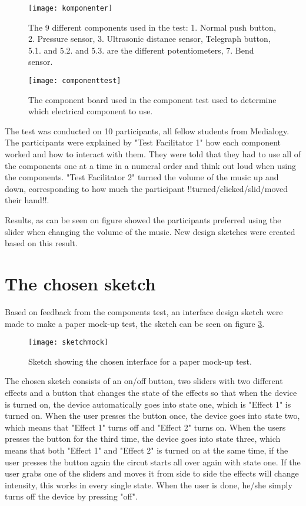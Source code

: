 \begin{figure}[!h] 
\centering
\texttt{[image: komponenter]}
\caption{\label{fig:komponenter} The 9 different components used in the test: 1. Normal push button, 2. Pressure sensor, 3. Ultrasonic distance sensor, Telegraph button, 5.1. and 5.2. and 5.3. are the different potentiometers, 7. Bend sensor.}
\end{figure}

\begin{figure}[!h] 
\centering
\texttt{[image: componenttest]}
\caption{\label{fig:componenttest} The component board used in the component test used to determine which electrical component to use.}
\end{figure}

The test was conducted on 10 participants, all fellow students from Medialogy. The participants were explained by "Test Facilitator 1" how each component worked and how to interact with them. They were told that they had to use all of the components one at a time in a numeral order and think out loud when using the components. "Test Facilitator 2" turned the volume of the music up and down, corresponding to how much the participant !!turned/clicked/slid/moved their hand!!.

Results, as can be seen on figure  showed the participants preferred using the slider when changing the volume of the music. New design sketches were created based on this result.


\section{The chosen sketch}
Based on feedback from the components test, an interface design sketch were made to make a paper mock-up test, the sketch can be seen on figure \ref{fig:sketchmock}. 

\begin{figure}[!h] 
\centering
\texttt{[image: sketchmock]}
\caption{\label{fig:sketchmock} Sketch showing the chosen interface for a paper mock-up test.}
\end{figure}

The chosen sketch consists of an on/off button, two sliders with two different effects and a button that changes the state of the effects so that when the device is turned on, the device automatically goes into state one, which is "Effect 1" is turned on. When the user presses the button once, the device goes into state two, which means that "Effect 1" turns off and "Effect 2" turns on. When the users presses the button for the third time, the device goes into state three, which means that both "Effect 1" and "Effect 2" is turned on at the same time, if the user presses the button again the circut starts all over again with state one. If the user grabs one of the sliders and moves it from side to side the effects will change intensity, this works in every single state. When the user is done, he/she simply turns off the device by pressing "off". 

